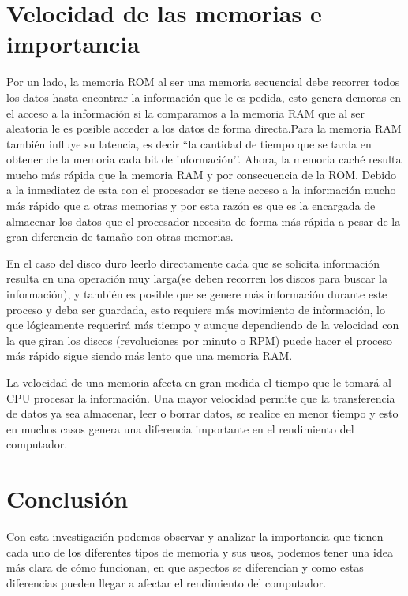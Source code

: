 \documentclass{article}
\begin{document}
\section{Velocidad de las memorias e importancia}
Por un lado, la memoria ROM al ser una memoria secuencial debe recorrer todos los datos hasta encontrar la información que le es pedida, esto genera demoras en el acceso a la información si la comparamos a la memoria RAM que al ser aleatoria le es posible acceder a los datos de forma directa.Para la memoria RAM también influye su latencia, es decir ``la cantidad de tiempo que se tarda en obtener de la memoria cada bit de información’’\cite{Documento}. Ahora, la memoria caché resulta mucho más rápida que la memoria RAM y por consecuencia de la ROM. Debido a la inmediatez de esta con el procesador se tiene acceso a la información mucho más rápido que a otras memorias y por esta razón es que es la encargada de almacenar los datos que el procesador necesita de forma más rápida a pesar de la gran diferencia de tamaño con otras memorias.\par
\vspace{5mm}
En el caso del disco duro leerlo directamente cada que se solicita información resulta en una operación muy larga(se deben recorren los discos para buscar la información), y también es posible que se genere más información durante este proceso y deba ser guardada, esto requiere más movimiento de información, lo que lógicamente requerirá más tiempo y aunque dependiendo de la velocidad con la que giran los discos (revoluciones por minuto o RPM) puede hacer el proceso más rápido sigue siendo más lento que una memoria RAM.\par

\vspace{5mm}
La velocidad de una memoria afecta en gran medida el tiempo que le tomará al CPU procesar la información. Una mayor velocidad permite que la transferencia de datos ya sea almacenar, leer o borrar datos, se realice en menor tiempo y esto en muchos casos genera una diferencia importante en el rendimiento del computador.

\section{Conclusión}
Con esta investigación podemos observar y analizar la importancia que tienen cada uno de los diferentes tipos de memoria y sus usos, podemos tener una idea más clara de cómo funcionan, en que aspectos se diferencian y como estas diferencias pueden llegar a afectar el rendimiento del computador.

\vspace{5mm}





\nocite{*}
\end{document}
